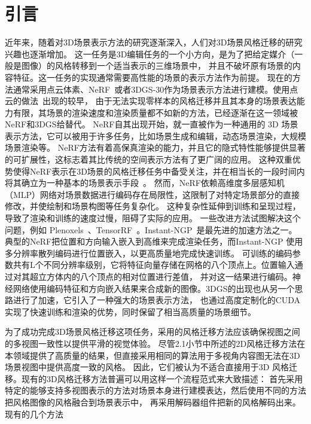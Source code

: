 \section{引言}
近年来，随着对3D场景表示方法的研究逐渐深入，人们对3D场景风格迁移的研究兴趣也逐渐增加。
这一任务是3D编辑任务的一个小方向，是为了把给定媒介（一般是图像）的风格转移到一个适当表示的三维场景中，
并且不破坏原有场景的内容特征。这一任务的实现通常需要高性能的场景的表示方法作为前提。
现在的方法通常采用点云体素、NeRF~\cite{mildenhall2021nerf}或者3DGS-30作为场景表示方法进行建模。使用点云的做法~\cite{huang2021learning,mu20223d,yin20213dstylenet}出现的较早，
由于无法实现零样本的风格迁移并且其本身的场景表达能力有限，其场景的渲染速度和渲染质量都不如新的方法，已经逐渐在这一领域被NeRF和3DGS给替代。
NeRF自其出现开始，就一直被作为一种通用的 3D 场景表示方法，它可以被用于许多任务，比如场景生成和编辑，动态场景渲染，大规模场景渲染等。
NeRF方法有着高保真渲染的能力，并且它的隐式特性能够提供显著的可扩展性，这标志着其比传统的空间表示方法有了更广阔的应用。
这种双重优势使得NeRF表示在3D场景的风格迁移任务中备受关注，并在相当长的一段时间内将其确立为一种基本的场景表示手段~\cite{zhang2022arf,chiang2022stylizing,li2023instant,chen2024upst,liu2023stylerf}。
然而，NeRF依赖高维度多层感知机（MLP）网络对场景数据进行编码存在局限性，这限制了对特定场景部分的直接修改，并使绘制和场景构图等任务复杂化。
这种复杂性延伸到训练和呈现过程，导致了渲染和训练的速度过慢，阻碍了实际的应用。
一些改进方法试图解决这个问题，例如 Plenoxels~\cite{fridovich2022plenoxels}、TensorRF~\cite{chen2022tensorf}。Instant-NGP~\cite{muller2022instant}是最先进的加速方法之一。
典型的NeRF把位置和方向输入嵌入到高维来完成渲染任务，而Instant-NGP 使用多分辨率散列编码进行位置嵌入，以更高质量地完成快速训练。
可训练的编码参数共有L个不同分辨率级别，它将特征向量存储在网格的八个顶点上。位置输入通过对其超立方体内的八个顶点的相对位置进行差值，
并对这一结果进行编码。神经网络使用编码特征和方向嵌入结果来合成新的图像。3DGS的出现也从另一个思路进行了加速，它引入了一种强大的场景表示方法，
也通过高度定制化的CUDA实现了快速训练和渲染的优势，同时保留了相当高质量的场景细节。
\par 为了成功完成3D场景风格迁移这项任务，采用的风格迁移方法应该确保视图之间的多视图一致性以提供平滑的视觉体验。
尽管2.1小节中所述的2D风格迁移方法在本领域提供了高质量的结果，但直接采用相同的算法用于多视角内容图无法在3D场景视图中提供高度一致的风格。
因此，它们被认为不适合直接用于3D 风格迁移。现有的3D风格迁移方法普遍可以用这样一个流程范式来大致描述：
首先采用特定的能够支持多视图表示的方法对场景本身进行建模表达，然后使用不同的方法把风格图像的风格融合到场景表示中，
再采用解码器组件把新的风格解码出来。现有的几个方法~\cite{saroha2024gaussian,jain2024stylesplat,zhang2024stylizedgs,chen2024gaussianeditor,liu2024stylegaussian}
